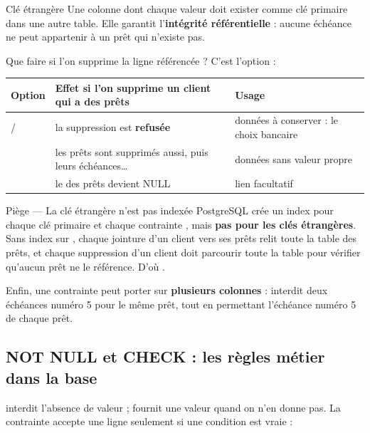\begin{definition}{Clé étrangère}
Une colonne dont chaque valeur doit exister comme clé primaire dans une autre table. Elle garantit
l'\textbf{intégrité référentielle} : aucune échéance ne peut appartenir à un prêt qui n'existe pas.
\end{definition}

Que faire si l'on supprime la ligne référencée ? C'est l'option  :

\begin{center}\small
\begin{tabularx}{\linewidth}{@{}P{3.3cm} L P{4.3cm}@{}}
\toprule
\textbf{Option} & \textbf{Effet si l'on supprime un client qui a des prêts} & \textbf{Usage} \\
\midrule
{} /  & la suppression est \textbf{refusée} & données à conserver : le choix bancaire \\
 & les prêts sont supprimés aussi, puis leurs échéances\dots & données sans valeur propre \\
 & le  des prêts devient NULL & lien facultatif \\
\bottomrule
\end{tabularx}
\end{center}

\begin{piege}{Piège --- La clé étrangère n'est pas indexée}
PostgreSQL crée un index pour chaque clé primaire et chaque contrainte , mais
\textbf{pas pour les clés étrangères}. Sans index sur , chaque jointure
d'un client vers ses prêts relit toute la table des prêts, et chaque suppression d'un client doit
parcourir toute la table pour vérifier qu'aucun prêt ne le référence. D'où .
\end{piege}

Enfin, une contrainte  peut porter sur \textbf{plusieurs colonnes} :
 interdit deux échéances numéro 5 pour le même prêt, tout en
permettant l'échéance numéro 5 de chaque prêt.

\subsection{NOT NULL et CHECK : les règles métier dans la base}

 interdit l'absence de valeur ;  fournit une valeur quand on n'en donne
pas. La contrainte  accepte une ligne seulement si une condition est vraie :

